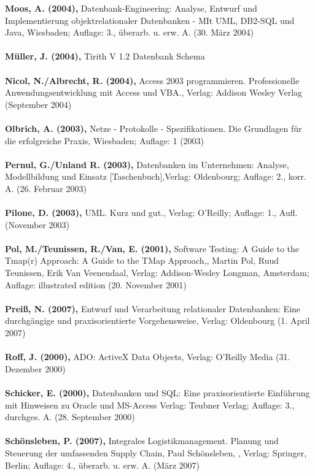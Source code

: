 \textbf{Moos, A. (2004),} Datenbank-Engineering: Analyse, Entwurf und Implementierung objektrelationaler Datenbanken - MIt UML, DB2-SQL und Java, Wiesbaden; Auflage: 3., überarb. u. erw. A. (30. März 2004)\\\\
\textbf{Müller, J. (2004),} Tirith V 1.2 Datenbank Schema\\\\ 
\textbf{Nicol, N./Albrecht, R. (2004),} Access 2003 programmieren. Professionelle Anwendungsentwicklung mit Access und VBA., Verlag: Addison Wesley Verlag (September 2004)\\\\
\textbf{Olbrich, A. (2003),} Netze - Protokolle - Spezifikationen. Die Grundlagen für die erfolgreiche Praxis, Wiesbaden; Auflage: 1 (2003)\\\\
\textbf{Pernul, G./Unland R. (2003),} Datenbanken im Unternehmen: Analyse, Modellbildung und Einsatz [Taschenbuch],Verlag: Oldenbourg; Auflage: 2., korr. A. (26. Februar 2003)\\\\
\textbf{Pilone, D. (2003),} UML. Kurz und gut., Verlag: O'Reilly; Auflage: 1., Aufl. (November 2003)\\\\
\textbf{Pol, M./Teunissen, R./Van, E. (2001),} Software Testing: A Guide to the Tmap(r) Approach: A Guide to the TMap Approach,, Martin Pol, Ruud Teunissen, Erik Van Veenendaal, Verlag: Addison-Wesley Longman, Amsterdam; Auflage: illustrated edition (20. November 2001)\\\\
\textbf{Preiß, N. (2007),} Entwurf und Verarbeitung relationaler Datenbanken: Eine durchgängige und praxisorientierte Vorgehensweise, Verlag: Oldenbourg (1. April 2007)\\\\
\textbf{Roff, J. (2000),} ADO: ActiveX Data Objects, Verlag: O'Reilly Media (31. Dezember 2000)\\\\
\textbf{Schicker, E. (2000),} Datenbanken und SQL: Eine praxisorientierte Einführung mit Hinweisen zu Oracle und MS-Access Verlag: Teubner Verlag; Auflage: 3., durchges. A. (28. September 2000)\\\\
\textbf{Schönsleben, P. (2007),} Integrales Logistikmanagement. Planung und Steuerung der umfassenden Supply Chain, Paul Schönsleben, , Verlag: Springer, Berlin; Auflage: 4., überarb. u. erw. A. (März 2007)\\\\
